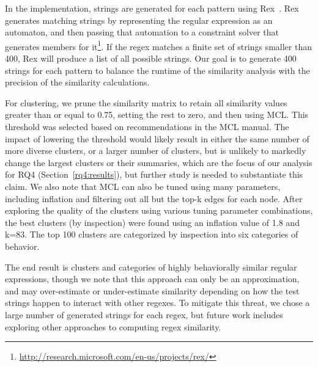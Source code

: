 In the implementation, strings are generated for each pattern using Rex~\cite{rex}.  Rex generates matching strings by representing the regular expression as an automaton, and then passing that automation to a constraint solver that generates members for it\footnote{\url{http://research.microsoft.com/en-us/projects/rex/}}.  If the regex matches a finite set of strings smaller than 400, Rex will produce a list of all possible strings.
Our goal is to generate 400 strings for each pattern to balance the runtime of the similarity analysis with the precision of the similarity calculations.

For clustering, we prune the similarity matrix to retain all similarity values greater than or equal to 0.75, setting the rest to zero, and then using MCL.
This threshold was selected based on recommendations in the MCL manual. The impact of lowering the threshold would likely result  in either the same number of more diverse clusters, or a larger number of clusters, but is unlikely to markedly change the largest clusters or their summaries, which are the focus of our analysis for RQ4 (Section~\ref{rq4:results}), but further study is needed to substantiate this claim.
We also note that MCL can also be tuned using many parameters, including inflation and filtering out all but the top-k edges for each node.
After exploring the quality of the clusters using various tuning parameter combinations, the best clusters (by inspection) were found using an inflation value of 1.8 and k=83.   The top 100 clusters are categorized by inspection into six categories of behavior.

The end result is clusters and categories of highly behaviorally similar regular expressions, though we note that this approach can only be an approximation, and may over-estimate or under-estimate similarity depending on how the test strings happen to interact with other regexes. To mitigate this threat, we chose a large number of generated strings for each regex, but future work includes exploring other approaches to computing regex similarity.
